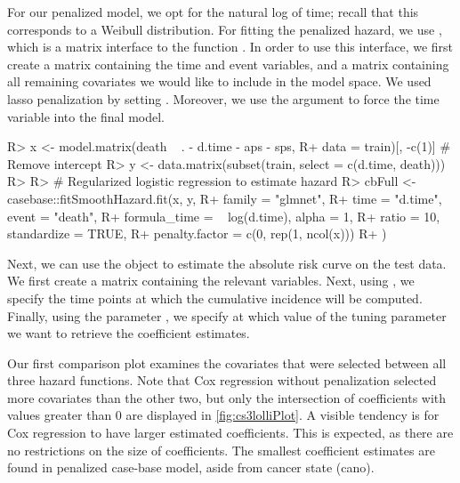 \documentclass[
]{jss}
\begin{document}
For our penalized model, we opt for the natural log of time; recall that
this corresponds to a Weibull distribution. For fitting the penalized
hazard, we use , which is a matrix interface
to the function . In order to use this interface,
we first create a matrix  containing the time and event
variables, and a matrix  containing all remaining covariates we
would like to include in the model space. We used lasso penalization by
setting . Moreover, we use the argument
 to force the time variable into the final model.

\begin{CodeChunk}

\begin{CodeInput}
R> x <- model.matrix(death ~ . - d.time - aps - sps, 
R+                   data = train)[, -c(1)] # Remove intercept
R> y <- data.matrix(subset(train, select = c(d.time, death)))
R> 
R> # Regularized logistic regression to estimate hazard
R> cbFull <- casebase::fitSmoothHazard.fit(x, y,
R+   family = "glmnet",
R+   time = "d.time", event = "death",
R+   formula_time = ~ log(d.time), alpha = 1,
R+   ratio = 10, standardize = TRUE,
R+   penalty.factor = c(0, rep(1, ncol(x)))
R+ )
\end{CodeInput}
\end{CodeChunk}

Next, we can use the object  to estimate the absolute risk
curve on the test data. We first create a matrix  containing
the relevant variables. Next, using , we specify the time
points at which the cumulative incidence will be computed. Finally,
using the parameter , we specify at which value
of the tuning parameter we want to retrieve the coefficient estimates.

\begin{CodeChunk}

\end{CodeChunk}

Our first comparison plot examines the covariates that were selected
between all three hazard functions. Note that Cox regression without
penalization selected more covariates than the other two, but only the
intersection of coefficients with values greater than 0 are displayed in
\ref{fig:cs3lolliPlot}. A visible tendency is for Cox regression to have
larger estimated coefficients. This is expected, as there are no
restrictions on the size of coefficients. The smallest coefficient
estimates are found in penalized case-base model, aside from cancer
state (cano).
\end{document}
